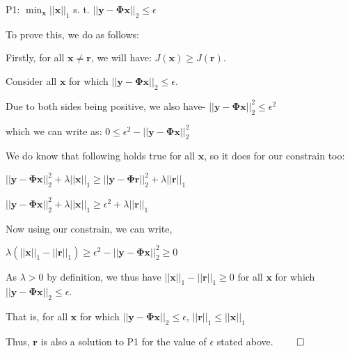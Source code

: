 \documentclass[fleqn, 11pt]{article}
\newcommand{\bs}[1]{\boldsymbol{#1}}
\begin{document}
P1: $\min_{\bs{x}} ||\bs{x}||_1$ s. t. $|| \bs{y}-\bs{\Phi} \bs{x} ||_2  \leq \epsilon $

\smallskip

To prove this, we do as follows:

Firstly, for all $\bs{x} \neq \bs{r}$, we will have:  
$J(\bs{x}) \geq J(\bs{r})$.

\medskip 

Consider all $\bs{x}$ for which $|| \bs{y}-\bs{\Phi} \bs{x} ||_2  \leq \epsilon$.

Due to both sides being positive, we also have- 
$|| \bs{y}-\bs{\Phi} \bs{x} ||_2^2  \leq \epsilon^2$

\medskip

which we can write as: 
$ 0 \leq \epsilon^2- || \bs{y}-\bs{\Phi} \bs{x} ||_2^2$

\medskip 

We do know that following holds true for all $\bs{x}$, so it does for our constrain too:

\medskip

$|| \bs{y}-\bs{\Phi} \bs{x} ||_2^2 + \lambda ||\bs{x}||_1 
\geq || \bs{y}-\bs{\Phi} \bs{r} ||_2^2 + \lambda ||\bs{r}||_1 
$


\medskip

$|| \bs{y}-\bs{\Phi} \bs{x} ||_2^2 + \lambda ||\bs{x}||_1 
\geq \epsilon^2 + \lambda ||\bs{r}||_1 
$

\medskip

Now using our constrain, we can write, 

\medskip

$  \lambda ( ||\bs{x}||_1 -   ||\bs{r}||_1  ) \geq 
\epsilon^2 - || \bs{y}-\bs{\Phi} \bs{x} ||_2^2 \geq 0
$

\medskip

As $\lambda>0$ by definition, we thus have $||\bs{x}||_1 -   ||\bs{r}||_1  \geq 0$ 
for all $\bs{x}$ for which $|| \bs{y}-\bs{\Phi} \bs{x} ||_2  \leq \epsilon$.

\medskip

That is, for all  $\bs{x}$ for which $|| \bs{y}-\bs{\Phi} \bs{x} ||_2  \leq \epsilon$, 
$  ||\bs{r}||_1 \leq ||\bs{x}||_1 $ 

\smallskip

Thus, $\bs{r}$ is also a solution to P1 for the value of $\epsilon$ stated above. 
$\qed$
\end{document}
